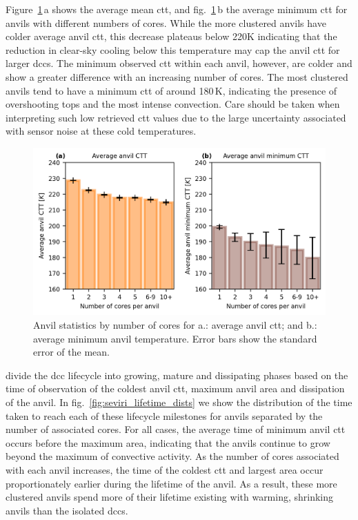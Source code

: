 Figure~\ref{fig:seviri_anvil_ctt_stats}\,a shows the average mean \acrshort{ctt}, and fig.~\ref{fig:seviri_anvil_ctt_stats}\,b the average minimum \acrshort{ctt} for anvils with different numbers of cores. 
While the more clustered anvils have colder average anvil \acrshort{ctt}, this decrease plateaus below 220K indicating that the reduction in clear-sky cooling below this temperature may cap the anvil \acrshort{ctt} for larger \acrshort{dcc}s. 
The minimum observed \acrshort{ctt} within each anvil, however, are colder and show a greater difference with an increasing number of cores. 
The most clustered anvils tend to have a minimum \acrshort{ctt} of around 180\,\unit{K}, indicating the presence of overshooting tops and the most intense convection. 
Care should be taken when interpreting such low retrieved \acrshort{ctt} values due to the large uncertainty associated with sensor noise at these cold temperatures.


\begin{figure}[tp]
    \includegraphics[width=\textwidth]{figures/ch3_07.png}
    \caption[
    Anvil statistics by number of cores for average anvil \acrshort{ctt} and average minimum anvil temperature
    ]{
    Anvil statistics by number of cores for a.: average anvil \acrshort{ctt}; and b.: average minimum anvil temperature. Error bars show the standard error of the mean.
    }
    \label{fig:seviri_anvil_ctt_stats}
\end{figure}


\citet{futyan_deep_2007} divide the \acrshort{dcc} lifecycle into growing, mature and dissipating phases based on the time of observation of the coldest anvil \acrshort{ctt}, maximum anvil area and dissipation of the anvil. 
In fig.~\ref{fig:seviri_lifetime_dists} we show the distribution of the time taken to reach each of these lifecycle milestones for anvils separated by the number of associated cores. 
For all cases, the average time of minimum anvil \acrshort{ctt} occurs before the maximum area, indicating that the anvils continue to grow beyond the maximum of convective activity. 
As the number of cores associated with each anvil increases, the time of the coldest \acrshort{ctt} and largest area occur proportionately earlier during the lifetime of the anvil. 
As a result, these more clustered anvils spend more of their lifetime existing with warming, shrinking anvils than the isolated \acrshort{dcc}s.


